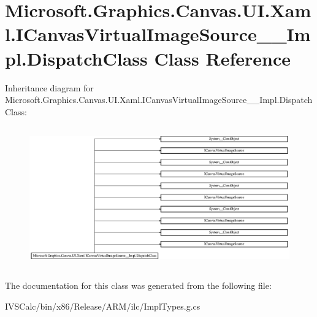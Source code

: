 \hypertarget{class_microsoft_1_1_graphics_1_1_canvas_1_1_u_i_1_1_xaml_1_1_i_canvas_virtual_image_source_____impl_1_1_dispatch_class}{}\section{Microsoft.\+Graphics.\+Canvas.\+U\+I.\+Xaml.\+I\+Canvas\+Virtual\+Image\+Source\+\_\+\+\_\+\+Impl.\+Dispatch\+Class Class Reference}
\label{class_microsoft_1_1_graphics_1_1_canvas_1_1_u_i_1_1_xaml_1_1_i_canvas_virtual_image_source_____impl_1_1_dispatch_class}
Inheritance diagram for Microsoft.\+Graphics.\+Canvas.\+U\+I.\+Xaml.\+I\+Canvas\+Virtual\+Image\+Source\+\_\+\+\_\+\+Impl.\+Dispatch\+Class\+:\begin{figure}[H]
\begin{center}
\leavevmode
\includegraphics[height=6.123260cm]{class_microsoft_1_1_graphics_1_1_canvas_1_1_u_i_1_1_xaml_1_1_i_canvas_virtual_image_source_____impl_1_1_dispatch_class}
\end{center}
\end{figure}


The documentation for this class was generated from the following file\+:\begin{DoxyCompactItemize}
\item 
I\+V\+S\+Calc/bin/x86/\+Release/\+A\+R\+M/ilc/Impl\+Types.\+g.\+cs\end{DoxyCompactItemize}

